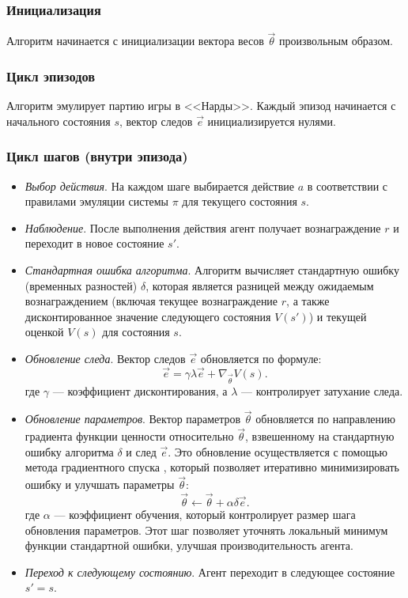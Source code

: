 
\subsubsection{Инициализация}
Алгоритм начинается с инициализации вектора весов $\vec{\theta}$ произвольным образом.

\subsubsection{Цикл эпизодов}
Алгоритм эмулирует партию игры в <<Нарды>>. Каждый эпизод начинается с начального состояния $s$, вектор следов $\vec{e}$ инициализируется нулями.

\subsubsection{Цикл шагов (внутри эпизода)}
\begin{itemize}
    \item \textit{Выбор действия}. На каждом шаге выбирается действие $a$ в соответствии с правилами эмуляции системы $\pi$ для текущего состояния $s$.
    \item \textit{Наблюдение}. После выполнения действия агент получает вознаграждение $r$ и переходит в новое состояние $s'$.
    \item \textit{Стандартная ошибка алгоритма}. Алгоритм вычисляет стандартную ошибку (временных разностей) $\delta$, которая является разницей между ожидаемым вознаграждением (включая текущее вознаграждение $r$, а также дисконтированное значение следующего состояния $V(s')$) и текущей оценкой $V(s)$ для состояния $s$.
    \item \textit{Обновление следа}. Вектор следов $\vec{e}$ обновляется по формуле:
    \begin{equation}
        \vec{e} = \gamma \lambda \vec{e} + \nabla_{\vec{\theta}} V(s).
    \end{equation}
    где $\gamma$ --- коэффициент дисконтирования, а $\lambda$ --- контролирует затухание следа.
    \item \textit{Обновление параметров}. Вектор параметров $\vec{\theta}$ обновляется по направлению градиента функции ценности относительно $\vec{\theta}$, взвешенному на стандартную ошибку алгоритма $\delta$ и след $\vec{e}$. Это обновление осуществляется с помощью метода градиентного спуска \cite{gradient-descent}, который позволяет итеративно минимизировать ошибку и улучшать параметры $\vec{\theta}$:
    \begin{equation}
        \vec{\theta} \gets \vec{\theta} + \alpha \delta \vec{e}.
    \end{equation}
    где $\alpha$ — коэффициент обучения, который контролирует размер шага обновления параметров. Этот шаг позволяет уточнять локальный минимум функции стандартной ошибки, улучшая производительность агента.
    \item \textit{Переход к следующему состоянию}. Агент переходит в следующее состояние $s' = s$.
    \end{itemize}

